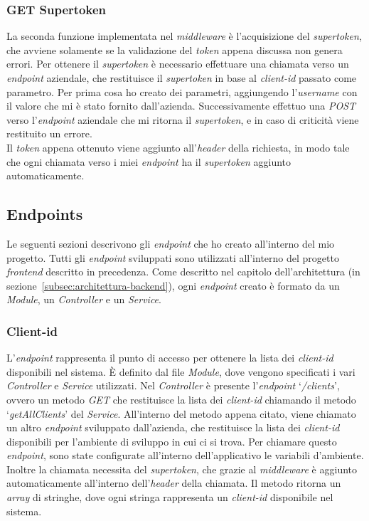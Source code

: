 \subsubsection{GET Supertoken}\label{subsubsec:get-supertoken}
La seconda funzione implementata nel \textit{middleware} è l'acquisizione del \textit{supertoken}, che avviene solamente se la validazione del \textit{token} appena discussa non genera errori.
Per ottenere il \textit{supertoken} è necessario effettuare una chiamata verso un \textit{endpoint} aziendale, che restituisce il \textit{supertoken} in base al \textit{client-id} passato come parametro.
Per prima cosa ho creato dei parametri, aggiungendo l'\textit{username} con il valore che mi è stato fornito dall'azienda.
Successivamente effettuo una \textit{POST} verso l'\textit{endpoint} aziendale che mi ritorna il \textit{supertoken}, e in caso di criticità viene restituito un errore.\\
Il \textit{token} appena ottenuto viene aggiunto all'\textit{header} della richiesta, in modo tale che ogni chiamata verso i miei \textit{endpoint} ha il \textit{supertoken} aggiunto automaticamente.

\subsection{Endpoints}\label{subsec:endpoints}
Le seguenti sezioni descrivono gli \textit{endpoint} che ho creato all'interno del mio progetto. Tutti gli \textit{endpoint} sviluppati 
sono utilizzati all'interno del progetto \textit{frontend} descritto in precedenza.
Come descritto nel capitolo dell'architettura (in sezione~\ref{subsec:architettura-backend}), ogni \textit{endpoint} creato è formato da un \textit{Module}, un \textit{Controller} e un \textit{Service}.

\subsubsection{Client-id}\label{subsubsec:client-id}
L'\textit{endpoint} rappresenta il punto di accesso per ottenere la lista dei \textit{client-id} disponibili nel sistema.
È definito dal file \textit{Module}, dove vengono specificati i vari \textit{Controller} e \textit{Service} utilizzati.
Nel \textit{Controller} è presente l'\textit{endpoint} `\textit{/clients}', ovvero un metodo \textit{GET} che restituisce la lista dei \textit{client-id} chiamando il metodo `\textit{getAllClients}' del \textit{Service}.
All’interno del metodo appena citato, viene chiamato un altro \textit{endpoint} sviluppato dall'azienda, che restituisce 
la lista dei \textit{client-id} disponibili per l'ambiente di sviluppo in cui ci si trova.
Per chiamare questo \textit{endpoint}, sono state configurate all'interno dell'applicativo le variabili d'ambiente.
Inoltre la chiamata necessita del \textit{supertoken}, che grazie al \textit{middleware} è aggiunto automaticamente all'interno 
dell'\textit{header} della chiamata.
Il metodo ritorna un \textit{array} di stringhe, dove ogni stringa rappresenta un \textit{client-id} disponibile nel sistema.

